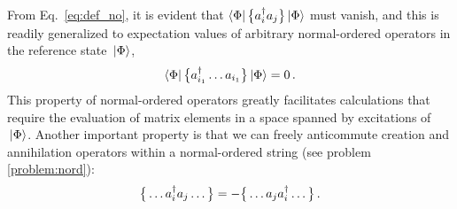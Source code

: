 {From Eq.~\eqref{eq:def_no}, it is evident that $\langle{\Phi}|\,{\big\{a^\dag_ia_j\big\}}\,|{\Phi}\rangle$ 
must vanish, and this is readily generalized to expectation values of 
arbitrary normal-ordered operators in the reference state $\,|{\Phi}\rangle$,
\begin{equation}\label{eq:nord_ex}
  \matrixe{\Phi}{\nord{\aaO_{i_1}\ldots\aO_{i_1}}}{\Phi} = 0\,.
\end{equation}
This property of normal-ordered operators greatly facilitates calculations 
that require the evaluation of matrix elements in a space spanned by excitations 
of $\,|{\Phi}\rangle$. Another important property is that we can freely anticommute 
creation and annihilation operators within a normal-ordered string
(see problem \ref{problem:nord}):
\begin{equation}\label{eq:nord_acomm}
  \nord{\ldots\aaO_i\aO_j\ldots} = -\nord{\ldots\aO_j\aaO_i\ldots}\,.
\end{equation}

}
